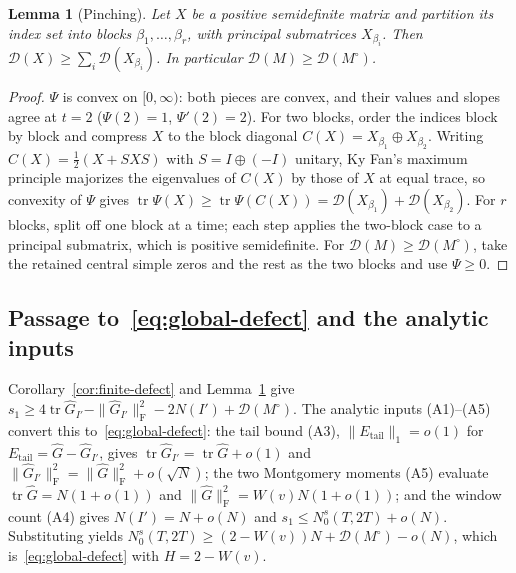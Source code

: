 \documentclass[11pt]{article}
\newtheorem{lemma}[theorem]{Lemma}
\theoremstyle{definition}
\DeclareMathOperator{\tr}{tr}
\newcommand{\F}{\mathrm{F}}
\begin{document}
\begin{lemma}[Pinching]\label{lem:pinch}
Let $X$ be a positive semidefinite matrix and partition its index set into
blocks $\beta_1,\dots,\beta_r$, with principal submatrices $X_{\beta_i}$. Then
$\mathcal D(X)\ge\sum_i\mathcal D(X_{\beta_i})$. In particular
$\mathcal D(M)\ge\mathcal D(M^\circ)$.
\end{lemma}

\begin{proof}
$\Psi$ is convex on $[0,\infty)$: both pieces are convex, and their values and
slopes agree at $t=2$ ($\Psi(2)=1$, $\Psi'(2)=2$). For two blocks, order the
indices block by block and compress $X$ to the block diagonal
$C(X)=X_{\beta_1}\oplus X_{\beta_2}$. Writing $C(X)=\tfrac12(X+SXS)$ with
$S=I\oplus(-I)$ unitary, Ky Fan's maximum principle majorizes the eigenvalues of
$C(X)$ by those of $X$ at equal trace, so convexity of $\Psi$ gives
$\tr\Psi(X)\ge\tr\Psi(C(X))=\mathcal D(X_{\beta_1})+\mathcal D(X_{\beta_2})$.
For $r$ blocks, split off one block at a time; each step applies the two-block
case to a principal submatrix, which is positive semidefinite. For
$\mathcal D(M)\ge\mathcal D(M^\circ)$, take the retained central simple zeros
and the rest as the two blocks and use $\Psi\ge0$.
\end{proof}

\subsection{Passage to~\eqref{eq:global-defect} and the analytic inputs}

Corollary~\ref{cor:finite-defect} and Lemma~\ref{lem:pinch} give
$s_1\ge4\tr\widehat G_{I'}-\|\widehat G_{I'}\|_{\F}^2-2N(I')+\mathcal D(M^\circ)$.
The analytic inputs (A1)--(A5) convert this to~\eqref{eq:global-defect}: the tail
bound (A3), $\|E_{\mathrm{tail}}\|_1=o(1)$ for
$E_{\mathrm{tail}}=\widehat G-\widehat G_{I'}$, gives
$\tr\widehat G_{I'}=\tr\widehat G+o(1)$ and
$\|\widehat G_{I'}\|_{\F}^2=\|\widehat G\|_{\F}^2+o(\sqrt N)$; the two
Montgomery moments (A5) evaluate $\tr\widehat G=N(1+o(1))$ and
$\|\widehat G\|_{\F}^2=W(v)N(1+o(1))$; and the window count (A4) gives
$N(I')=N+o(N)$ and $s_1\le N_0^s(T,2T)+o(N)$. Substituting yields
$N_0^s(T,2T)\ge(2-W(v))N+\mathcal D(M^\circ)-o(N)$, which
is~\eqref{eq:global-defect} with $H=2-W(v)$.
\end{document}

